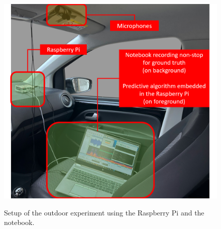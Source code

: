 \begin{figure}[htbp]
    \raggedright
        \caption{Setup of the outdoor experiment using the Raspberry Pi and the notebook.}
        \includegraphics[width=.8\textwidth]{resources/images/050-methods/Methods_evaluation_outdoor.png}
        \label{fig:methods_evaluation_outdoor_experiment}
\end{figure}